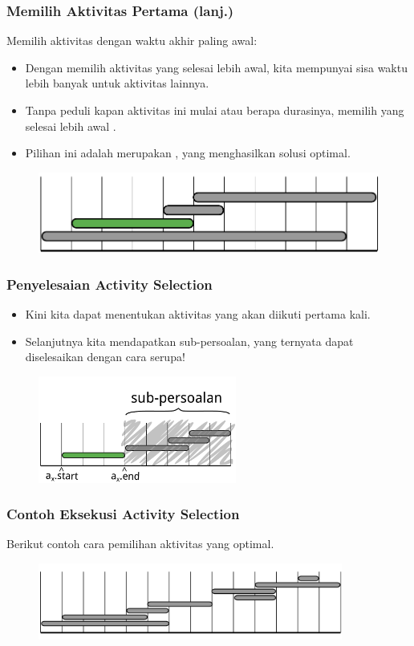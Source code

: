 \begin{frame}
  \frametitle{Memilih Aktivitas Pertama (lanj.)}
  Memilih aktivitas dengan waktu akhir paling awal:
  \begin{itemize}
    \item Dengan memilih aktivitas yang selesai lebih awal, kita mempunyai sisa waktu lebih banyak untuk aktivitas lainnya.
    \item Tanpa peduli kapan aktivitas ini mulai atau berapa durasinya, memilih yang selesai lebih awal .
    \item Pilihan ini adalah merupakan \fGreedyChoice, yang  menghasilkan solusi optimal.
  \end{itemize}

  \begin{figure}
    \includegraphics[width=9 cm]{asset/activity-selection-choice-3.pdf}
  \end{figure}
\end{frame}

\begin{frame}
  \frametitle{Penyelesaian Activity Selection}
  \begin{itemize}
    \item Kini kita dapat menentukan aktivitas yang akan diikuti pertama kali.
    \item Selanjutnya kita mendapatkan sub-persoalan, yang ternyata dapat diselesaikan dengan cara serupa!
  \end{itemize}
  \begin{figure}
    \includegraphics[width=6.5cm]{asset/activity-selection-subproblem.pdf}
  \end{figure}
\end{frame}

\begin{frame}
  \frametitle{Contoh Eksekusi Activity Selection}
  Berikut contoh cara pemilihan aktivitas yang optimal.
  \begin{figure}
    \includegraphics[width=10cm]{asset/activity-selection-algo-1.pdf}
  \end{figure}
\end{frame}

